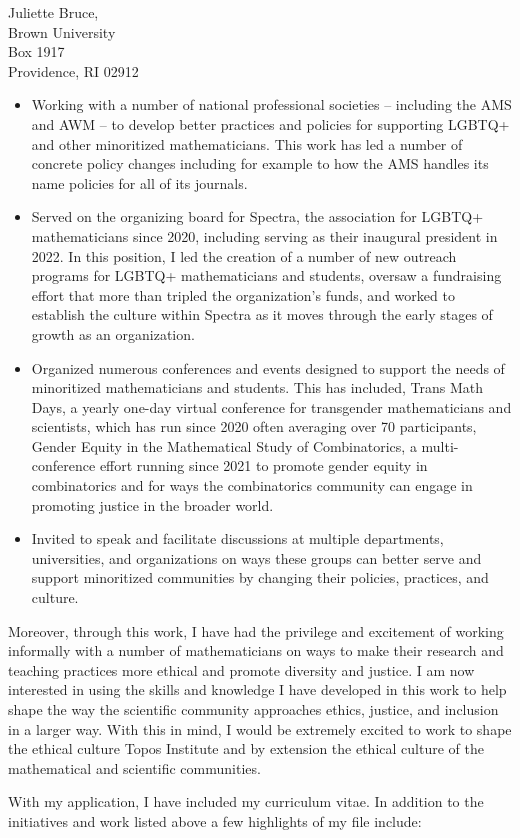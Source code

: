 \documentclass[11pt]{brownletter}
\begin{document}
\begin{letter}{Juliette Bruce,\\ 
               Brown University\\ 
               Box 1917\\ 
               Providence, RI 02912}
\begin{itemize}
\item Working with a number of national professional societies -- including the AMS and AWM -- to develop better practices and policies for supporting LGBTQ+ and other minoritized mathematicians. This work has led a number of concrete policy changes including for example to how the AMS handles its name policies for all of its journals. 
\item Served on the organizing board for Spectra, the association for LGBTQ+ mathematicians since 2020, including serving as their inaugural president in 2022. In this position, I led the creation of a number of new outreach programs  for LGBTQ+ mathematicians and students, oversaw a fundraising effort that more than tripled the organization's funds,  and worked to establish the culture within Spectra as it moves through the early stages of growth as an organization. 
\item Organized numerous conferences and events designed to support the needs of minoritized mathematicians and students. This has included,  Trans Math Days, a yearly one-day virtual conference for transgender mathematicians and scientists, which has run since 2020 often averaging over 70 participants, Gender Equity in the Mathematical Study of Combinatorics, a multi-conference effort running since 2021 to promote gender equity in combinatorics and for ways the combinatorics community can engage in promoting justice in the broader world.  
\item Invited to speak and facilitate discussions at multiple departments, universities, and organizations on ways these groups can better serve and support minoritized communities by changing their policies, practices, and culture. 
\end{itemize}

Moreover, through this work, I have had the privilege and excitement of working informally with a number of mathematicians on ways to make their research and teaching practices more ethical and promote diversity and justice. I am now interested in using the skills and knowledge I have developed in this work to help shape the way the scientific community approaches ethics, justice, and inclusion in a larger way. With this in mind, I would be extremely excited to work to shape the ethical culture Topos Institute and by extension the ethical culture of the mathematical and scientific communities. 


With my application, I have included my curriculum vitae. In addition to the initiatives and work listed above a few highlights of my file include:
\begin{itemize}


\end{itemize}
\end{letter}
\end{document}
